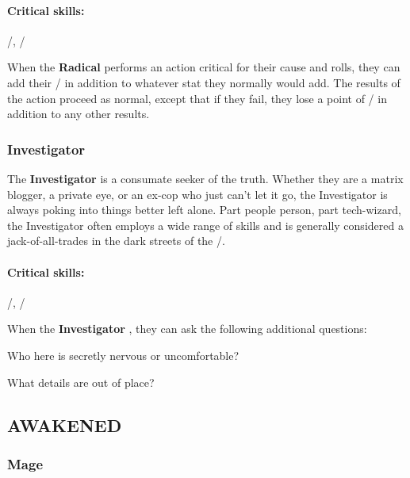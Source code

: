 \documentclass[oneside,10pt]{article}
\begin{document}
\begin{multicols}{2}
\paragraph{Critical skills:}

\flair/, \mastery/

\begin{tcolorbox}[title=Special Move]
   When the \textbf{Radical} performs
  an action critical for their cause and rolls, they can add their
  \essence/ in addition to whatever stat they normally would add. The
  results of the action proceed as normal, except that if they fail,
  they lose a point of \essence/ in addition to any other results. 
\end{tcolorbox}

\subsubsection{Investigator}

The \textbf{Investigator} is a consumate seeker of the truth. Whether
they are a matrix blogger, a private eye, or an ex-cop who just can't
let it go, the Investigator is always poking into things better left
alone. Part people person, part tech-wizard, the Investigator often
employs a wide range of skills and is generally considered a
jack-of-all-trades in the dark streets of the \SW/.

\paragraph{Critical skills:}
\mastery/, \flair/

\begin{tcolorbox}[title=Special Move]
   When the \textbf{Investigator}
  , they can ask the following
  additional questions:
  \begin{dent}
    \tcirc{} Who here is secretly nervous or uncomfortable?

    \tcirc{} What details are out of place?
  \end{dent}
\end{tcolorbox}

\subsection{AWAKENED}

\subsubsection{Mage}


\end{multicols}
\end{document}
